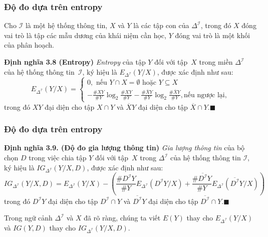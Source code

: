 \documentclass[notheorems,xcolor=dvipsnames]{beamer}
\newcommand{\mI}		{\mathcal{I}}
\newcommand{\myend}		{\mbox{}\hfill\mbox{{\tiny$\!\blacksquare$}}}
\renewcommand{\sharp}		{\#}
\begin{document}
\begin{frame}\frametitle{\bf Độ đo dựa trên entropy}
	Cho $\mI$ là một hệ thống thông tin, $X$ và $Y$ là các tập con của $\Delta^\mI$, trong đó $X$ đóng vai trò là tập các mẫu dương của khái niệm cần học, $Y$ đóng vai trò là một khối của phân hoạch.
	\begin{block}{\bf Định nghĩa 3.8 (Entropy)}
		{\em Entropy} của tập $Y$ đối với tập~$X$ trong miền $\Delta^\mI$ của hệ thống thông tin~$\mI$, ký hiệu là $E_{\Delta^\mI}(Y/X)$, được xác định như sau:
		{\small
		\begin{equation}
			E_{\Delta^\mI}(Y/X)=
			\begin{cases}
				0, \text{ nếu } Y \cap X = \emptyset \text{ hoặc } Y \subseteq X\\
				\displaystyle - \frac{\sharp XY}{\sharp Y}\log_2\frac{\sharp XY}{\sharp Y}-\frac{\sharp \overline{X}Y}{\sharp Y}\log_2\frac{\sharp \overline{X}Y}{\sharp Y}, \text{nếu ngược lại,} \label{eq:Entropy}
			\end{cases}
		\end{equation}
		}
		trong đó $XY$ đại diện cho tập $X \cap Y$ và $\overline{X}Y$ đại diện cho tập $\overline{X} \cap Y$.\myend
	\end{block}
\end{frame}

\begin{frame}\frametitle{\bf Độ đo dựa trên entropy}
	\begin{block}{\bf Định nghĩa 3.9. (Độ đo gia lượng thông tin)}
		{\em Gia lượng thông tin} của bộ chọn $D$ trong việc chia tập $Y$ đối với tập~$X$ trong $\Delta^\mI$ của hệ thống thông tin $\mI$, ký hiệu là $IG_{\Delta^\mI}(Y/X, D)$, được xác định như sau:
		{\footnotesize
			\begin{equation}
				IG_{\Delta^\mI}(Y/X, D) = E_{\Delta^\mI}(Y/X)-
				\left(\!\!\frac{\sharp D^\mI Y}{\sharp Y}E_{\Delta^\mI}(D^\mI Y/X)+\frac{\sharp \overline{D^\mI}Y}{\sharp Y}E_{\Delta^\mI}(\overline{D^\mI}Y/X)\!\!\right)  \label{eq:InfoGain}
			\end{equation}
		}
		trong đó $D^\mI Y$ đại diện cho tập $D^\mI \cap Y$ và $\overline{D^\mI}Y$ đại diện cho tập $\overline{D^\mI} \cap Y$.\myend
	\end{block}
		
	Trong ngữ cảnh $\Delta^\mI$ và $X$ đã rõ ràng, chúng ta viết $E(Y)$ thay cho $E_{\Delta^\mI}(Y/X)$ và $IG(Y, D)$ thay cho $IG_{\Delta^\mI}(Y/X, D)$.
\end{frame}
\end{document}
